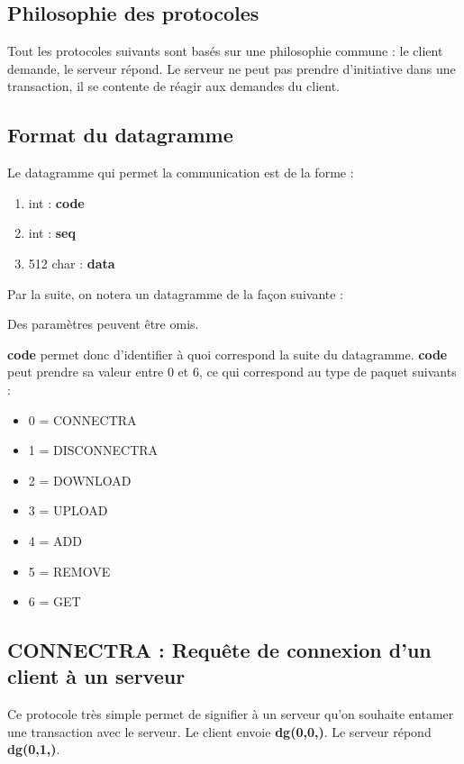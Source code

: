 \documentclass[10pt,a4paper]{article}
\begin{document}
\subsection{Philosophie des protocoles}
Tout les protocoles suivants sont basés sur une philosophie commune : le client demande, le serveur répond.
Le serveur ne peut pas prendre d'initiative dans une transaction, il se contente de réagir aux demandes du client.
\subsection{Format du datagramme}

Le datagramme qui permet la communication est de la forme :
\begin{enumerate}
 \item int : \textbf{code}
 \item int : \textbf{seq}
 \item 512 char : \textbf{data}
\end{enumerate}

Par la suite, on notera un datagramme de la façon suivante :

\begin{center}
\end{center}

Des paramètres peuvent être omis.

\vspace{0.3cm}
\textbf{code} permet donc d'identifier à quoi correspond la suite du datagramme.
\textbf{code} peut prendre sa valeur entre 0 et 6, ce qui correspond au type de paquet suivants :
\begin{itemize}
 \item 0 = CONNECTRA
 \item 1 = DISCONNECTRA
 \item 2 = DOWNLOAD
 \item 3 = UPLOAD
 \item 4 = ADD
 \item 5 = REMOVE
 \item 6 = GET
\end{itemize}

\subsection{CONNECTRA : Requête de connexion d'un client à un serveur}
Ce protocole très simple permet de signifier à un serveur qu'on souhaite entamer une transaction avec le serveur.
Le client envoie \textbf{dg(0,0,)}. Le serveur répond \textbf{dg(0,1,)}.
\end{document}

